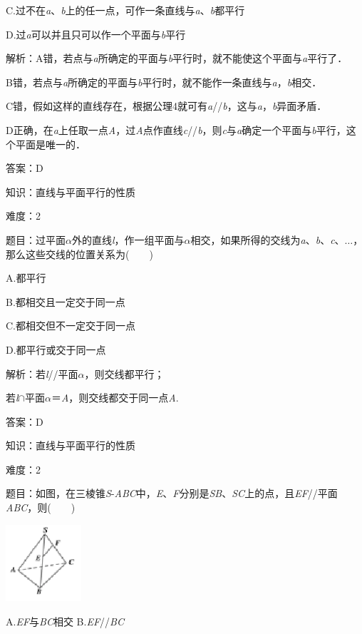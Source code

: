 \documentclass{article} %
\begin{document}
C.过不在\textit{a}、\textit{b}上的任一点，可作一条直线与\textit{a}、\textit{b}都平行

D.过\textit{a}可以并且只可以作一个平面与\textit{b}平行

解析：A错，若点与\textit{a}所确定的平面与\textit{b}平行时，就不能使这个平面与\textit{a}平行了．

B错，若点与\textit{a}所确定的平面与\textit{b}平行时，就不能作一条直线与\textit{a}，\textit{b}相交．

C错，假如这样的直线存在，根据公理4就可有\textit{a}//\textit{b}，这与\textit{a}，\textit{b}异面矛盾．

D正确，在\textit{a}上任取一点\textit{A}，过\textit{A}点作直线\textit{c}//\textit{b}，则\textit{c}与\textit{a}确定一个平面与\textit{b}平行，这个平面是唯一的．

答案：D　

知识：直线与平面平行的性质

难度：2

题目：过平面\textit{$\alpha$}外的直线\textit{l}，作一组平面与\textit{$\alpha$}相交，如果所得的交线为\textit{a}、\textit{b}、\textit{c}、$\dots$，那么这些交线的位置关系为(　　)

A.都平行

B.都相交且一定交于同一点

C.都相交但不一定交于同一点

D.都平行或交于同一点

解析：若\textit{l}//平面\textit{$\alpha$}，则交线都平行；

若\textit{l}$\mathrm{\cap}$平面\textit{$\alpha$}＝\textit{A}，则交线都交于同一点\textit{A}.

答案：D

知识：直线与平面平行的性质

难度：2

题目：如图，在三棱锥\textit{S}-\textit{ABC}中，\textit{E}、\textit{F}分别是\textit{SB}、\textit{SC}上的点，且\textit{EF}//平面\textit{ABC}，则(　　)

\includegraphics*[width=1.10in, height=1.12in, keepaspectratio=false]{image167}

A.\textit{EF}与\textit{BC}相交  B.\textit{EF}//\textit{BC}
\end{document}
